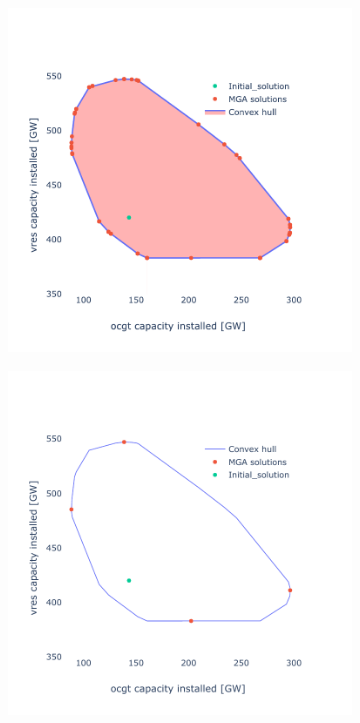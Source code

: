 \begin{figure}[h]\centering
	\begin{subfigure}{.5\textwidth}
		\includegraphics[width=1.\textwidth]{./Images/Comparison_1}
		\caption{}
		\label{fig:comparison_1}
	\end{subfigure}%
	\begin{subfigure}{.5\textwidth}
		\includegraphics[width=1.\textwidth]{./Images/Comparison_4}

\end{subfigure}
\end{figure}
